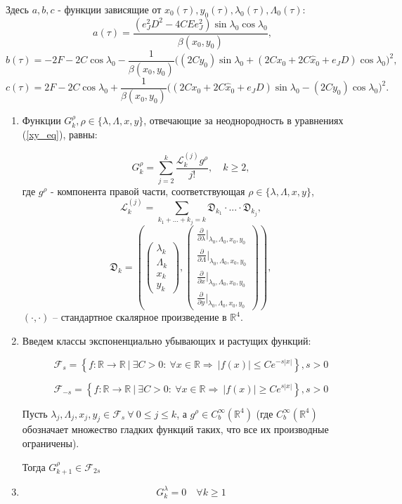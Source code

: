 Здесь $a,b,c$ - функции зависящие от $x_0(\tau), y_0(\tau), \lambda_0(\tau), \Lambda_0(\tau)$:
$$a(\tau) = \frac{\left( e_J^2 D^2 - 4CEe_J^2\right) \sin \lambda_0 \cos \lambda_0}{\beta(x_0,y_0)},$$
$$b(\tau) = -2F - 2C \cos \lambda_0 - \frac{1}{\beta(x_0,y_0)} \big( (2Cy_0)\sin \lambda_0 + (2Cx_0+2C \hat x_0 + e_JD)\cos \lambda_0  \big)^2,$$
$$c(\tau) = 2F - 2C \cos \lambda_0 + \frac{1}{\beta(x_0,y_0)} \big( (2Cx_0+2C \hat x_0 + e_JD)\sin \lambda_0 - (2Cy_0)\cos \lambda_0  \big)^2.$$
\begin{utv}

\begin{enumerate}

\item Функции $G_k^\rho, \rho \in \{\lambda,\Lambda,x,y\}$, отвечающие за неоднородность в уравнениях (\ref{xy_eq}), равны:

$$G_k^\rho = \sum_{j=2}^{k} \frac{\mathcal{L}_k^{(j)} g^\rho }{j!}, \quad k \ge 2,$$
где $g^\rho$ - компонента правой части, соответствующая $\rho \in \{ \lambda, \Lambda, x, y \}$,
$$\mathcal{L}_k^{(j)} = \sum_{k_1+...+k_j = k} \mathfrak{D}_{k_1} \cdot ... \cdot \mathfrak{D}_{k_j},$$
$$\mathfrak{D}_k = \left( \begin{pmatrix} \lambda_k\\ \Lambda_k \\ x_k \\ y_k \end{pmatrix},\begin{pmatrix} \frac{\partial}{\partial \lambda} |_{\lambda_0,\Lambda_0,x_0,y_0}\\ \frac{\partial}{\partial \Lambda} |_{\lambda_0,\Lambda_0,x_0,y_0} \\ \frac{\partial}{\partial x} |_{\lambda_0,\Lambda_0,x_0,y_0} \\ \frac{\partial}{\partial y} |_{\lambda_0,\Lambda_0,x_0,y_0} \end{pmatrix} \right),$$
$(\cdot,\cdot)$ -- стандартное скалярное произведение в $\mathbb{R}^4$.

\item Введем классы экспоненциально убывающих и растущих функций:

\[
\mathcal{F}_s = \left\{ f \colon \mathbb{R} \to \mathbb{R} \ \Big| \ \exists C > 0: \ \forall x \in \mathbb{R} \Rightarrow \ |f(x)| \leq C e^{-s|x|} \right\}, s > 0
\]

\[
\mathcal{F}_{-s} = \left\{ f \colon \mathbb{R} \to \mathbb{R} \ \Big| \ \exists C > 0: \ \forall x \in \mathbb{R} \Rightarrow \ |f(x)| \geq C e^{s|x|} \right\}, s > 0
\]

Пусть $\lambda_j, \Lambda_j, x_j, y_j \in \mathcal{F}_s \ \forall \ 0 \le j \le k$, а $g^\rho \in C_b^{\infty} (\mathbb{R}^4)$ (где $C_b^{\infty} (\mathbb{R}^4)$ обозначает множество гладких функций таких, что все их производные ограничены).

Тогда $G_{k+1}^\rho \in \mathcal{F}_{2s}$

\item $$G_k^\lambda = 0 \quad \forall k \ge 1$$  
\end{enumerate}

\end{utv}
